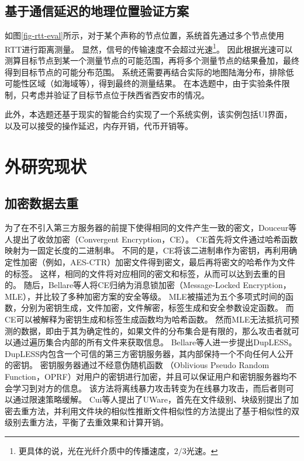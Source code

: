 \subsection{基于通信延迟的地理位置验证方案}


如图\ref{fig-rtt-eval}所示，对于某个声称的节点位置，系统首先通过多个节点使用RTT进行距离测量。
%
显然，信号的传输速度不会超过光速\footnote{更具体的说，光在光纤介质中的传播速度，$2/3$光速。}。
%
因此根据光速可以测算目标节点到某一个测量节点的可能范围，再将多个测量节点的结果叠加，最终得到目标节点的可能分布范围。
%
系统还需要再结合实际的地图陆海分布，排除低可能性区域（如海域等），得到最终的测量结果。
%
在本选题中，由于实验条件限制，只考虑并验证了目标节点位于陕西省西安市的情况。

\medskip
此外，本选题还基于现实的智能合约实现了一个系统实例，该实例包括UI界面，以及可以接受的操作延迟，内存开销，代币开销等。


\section{外研究现状}

\subsection{加密数据去重}

为了在不引入第三方服务器的前提下使得相同的文件产生一致的密文，Douceur等人提出了收敛加密（Convergent Encryption，CE）。
%
CE首先将文件通过哈希函数映射为一固定长度的二进制串。
%
不同的是，CE将该二进制串作为密钥，再利用确定性加密（例如，AES-CTR）加密文件得到密文，最后再将密文的哈希作为文件的标签。
%
这样，相同的文件将对应相同的密文和标签，从而可以达到去重的目的。
%
随后，Bellare等人将CE归纳为消息锁加密（Message-Locked Encryption，MLE），并比较了多种加密方案的安全等级。
%
MLE被描述为五个多项式时间的函数，分别为密钥生成，文件加密，文件解密，标签生成和安全参数设定函数。
%
而CE可以被解释为密钥生成和标签生成函数均为哈希函数。
%
然而MLE无法抵抗可预测的数据，即由于其为确定性的，如果文件的分布集合是有限的，那么攻击者就可以通过遍历集合内部的所有文件来获取信息。
%
Bellare等人进一步提出DupLESS。
%
DupLESS内包含一个可信的第三方密钥服务器，其内部保持一个不向任何人公开的密钥。
%
密钥服务器通过不经意伪随机函数 （Oblivious Pseudo Random Function，OPRF）对用户的密钥进行加密，并且可以保证用户和密钥服务器均不会学习到对方的信息。
%
该方法将离线暴力攻击转变为在线暴力攻击，而后者则可以通过限速策略缓解。
%
Cui等人提出了UWare，首先在文件级别、块级别提出了加密去重方法，并利用文件块的相似性推断文件相似性的方法提出了基于相似性的双级别去重方法，平衡了去重效果和计算开销。

